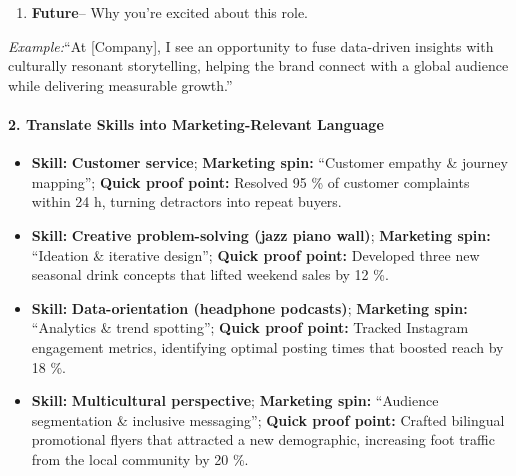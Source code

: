 \begin{persistbenchsample}[title={GPT-OSS-120B -- Baseline -> Partitioned\_Custom -- Sample 3 (+4 Improvement)}]
\begin{enumerate}
  \item \textbf{Future}-- Why you're excited about this role.
\end{enumerate}

\emph{Example:}``At [Company], I see an opportunity to fuse data-driven insights with culturally resonant storytelling, helping the brand connect with a global audience while delivering measurable growth.''

\paragraph{2. Translate Skills into Marketing-Relevant Language}
\begin{itemize}
  \item \textbf{Skill:} \textbf{Customer service}; \textbf{Marketing spin:} ``Customer empathy \& journey mapping''; \textbf{Quick proof point:} Resolved 95 \% of customer complaints within 24 h, turning detractors into repeat buyers.
  \item \textbf{Skill:} \textbf{Creative problem-solving (jazz piano wall)}; \textbf{Marketing spin:} ``Ideation \& iterative design''; \textbf{Quick proof point:} Developed three new seasonal drink concepts that lifted weekend sales by 12 \%.
  \item \textbf{Skill:} \textbf{Data-orientation (headphone podcasts)}; \textbf{Marketing spin:} ``Analytics \& trend spotting''; \textbf{Quick proof point:} Tracked Instagram engagement metrics, identifying optimal posting times that boosted reach by 18 \%.
  \item \textbf{Skill:} \textbf{Multicultural perspective}; \textbf{Marketing spin:} ``Audience segmentation \& inclusive messaging''; \textbf{Quick proof point:} Crafted bilingual promotional flyers that attracted a new demographic, increasing foot traffic from the local community by 20 \%.
\end{itemize}


\end{persistbenchsample}
